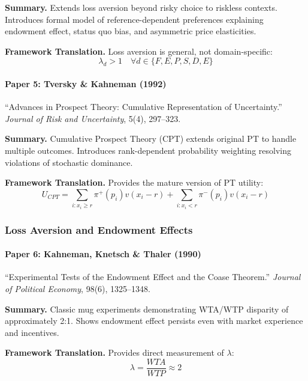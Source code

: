 \textbf{Summary.}
Extends loss aversion beyond risky choice to riskless contexts. Introduces 
formal model of reference-dependent preferences explaining endowment effect, 
status quo bias, and asymmetric price elasticities.

\textbf{Framework Translation.}
Loss aversion is general, not domain-specific:
\begin{equation}
\lambda_d > 1 \quad \forall d \in \{F, E, P, S, D, E\}
\end{equation}

\paragraph{Paper 5: Tversky \& Kahneman (1992)}

``Advances in Prospect Theory: Cumulative Representation of Uncertainty.''
\textit{Journal of Risk and Uncertainty}, 5(4), 297--323.

\textbf{Summary.}
Cumulative Prospect Theory (CPT) extends original PT to handle multiple outcomes.
Introduces rank-dependent probability weighting resolving violations of 
stochastic dominance.

\textbf{Framework Translation.}
Provides the mature version of PT utility:
\begin{equation}
U_{CPT} = \sum_{i: x_i \geq r} \pi^+(p_i) v(x_i - r) + \sum_{i: x_i < r} \pi^-(p_i) v(x_i - r)
\end{equation}

\subsubsection{Loss Aversion and Endowment Effects}

\paragraph{Paper 6: Kahneman, Knetsch \& Thaler (1990)}

``Experimental Tests of the Endowment Effect and the Coase Theorem.''
\textit{Journal of Political Economy}, 98(6), 1325--1348.

\textbf{Summary.}
Classic mug experiments demonstrating WTA/WTP disparity of approximately 2:1.
Shows endowment effect persists even with market experience and incentives.

\textbf{Framework Translation.}
Provides direct measurement of $\lambda$:
\begin{equation}
\lambda = \frac{WTA}{WTP} \approx 2
\end{equation}

